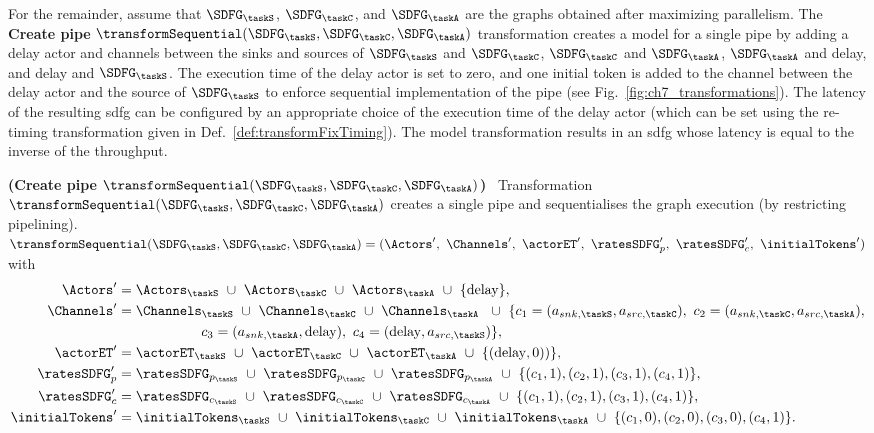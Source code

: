 For the remainder, assume that $\SDFG_{\taskS}$, $\SDFG_{\taskC}$, and $\SDFG_{\taskA}$ are the graphs obtained after maximizing parallelism. The \textbf{Create pipe} $\transformSequential(\SDFG_{\taskS},\SDFG_{\taskC},\SDFG_{\taskA})$ transformation creates a model for a single pipe by adding a delay actor and channels between the sinks and sources of $\SDFG_{\taskS}$ and $\SDFG_{\taskC}$, $\SDFG_{\taskC}$ and $\SDFG_{\taskA}$, $\SDFG_{\taskA}$ and delay, and delay and $\SDFG_{\taskS}$. 
The execution time of the delay actor is set to zero, and one initial token is added to the channel between the delay actor and the source of $\SDFG_{\taskS}$ to enforce sequential implementation of the pipe (see Fig.~\ref{fig:ch7_transformations}).
The latency of the resulting \gls{sdfg} can be configured by an appropriate choice of the execution time of the delay actor (which can be set using the re-timing transformation given in Def.\ \ref{def:transformFixTiming}).
The model transformation results in an \gls{sdfg} whose latency is equal to the inverse of the throughput.

\begin{definition}
{\textbf{(Create pipe $\transformSequential(\SDFG_{\taskS},\SDFG_{\taskC},\SDFG_{\taskA})$)}}~\label{def:transformSequential}
Transformation $\transformSequential(\SDFG_{\taskS},\SDFG_{\taskC},\SDFG_{\taskA})$ creates a single pipe and sequentialises the graph execution (by restricting pipelining). $\transformSequential(\SDFG_{\taskS},\SDFG_{\taskC},\SDFG_{\taskA})= (\Actors^{\prime},\ \Channels^{\prime},\ \actorET^{\prime},\ \ratesSDFG_p^{\prime},\ \ratesSDFG_c^{\prime},\ \initialTokens^{\prime})$ with
\begin{align}
\Actors^{\prime}&=\Actors_{\taskS}\ \cup\ \Actors_{\taskC}\ \cup\ \Actors_{\taskA}\ \cup\ \{\text{delay}\},\nonumber\\ \Channels^{\prime}&=\Channels_{\taskS}\ \cup\ \Channels_{\taskC}\ \cup\ \Channels_{\taskA} \nonumber %
\ \ \cup\ \{c_1=(a_{snk,\taskS},a_{src,\taskC}),\ c_2=(a_{snk,\taskC},a_{src,\taskA}),\nonumber\\ &\ \hspace*{2cm} c_3=(a_{snk,\taskA},\text{delay}),\ c_4=(\text{delay},a_{src,\taskS})\},\nonumber\\
\actorET^{\prime}&=\actorET_{\taskS}\ \cup\ \actorET_{\taskC}\ \cup\ \actorET_{\taskA}\ \cup\ \{(\text{delay},0))\},\nonumber\\
\ratesSDFG_p^{\prime}&=\ratesSDFG_{p_{\taskS}}\ \cup\ \ratesSDFG_{p_{\taskC}}\ \cup\ \ratesSDFG_{p_{\taskA}}\ \cup\ \{(c_1,1),(c_2,1),(c_3,1),(c_4,1)\},\nonumber\\
\ratesSDFG_c^{\prime}&=\ratesSDFG_{c_{\taskS}}\ \cup\ \ratesSDFG_{c_{\taskC}}\ \cup\ \ratesSDFG_{c_{\taskA}}\ \cup\ \{(c_1,1),(c_2,1),(c_3,1),(c_4,1)\},\nonumber\\
\initialTokens^{\prime}&=\initialTokens_{\taskS}\ \cup\ \initialTokens_{\taskC}\ \cup\ \initialTokens_{\taskA}\ \cup\ \{(c_1,0),(c_2,0),(c_3,0),(c_4,1)\}. \nonumber
\end{align}
\end{definition}

